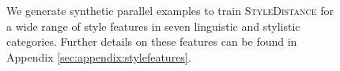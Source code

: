 {\begin{figure}[ht!]
{
        }
        \caption{We generate synthetic parallel examples to train \textsc{StyleDistance} for a wide range of style features in seven linguistic and stylistic categories. Further details on these features can be found in Appendix \ref{sec:appendix:stylefeatures}.}
        \label{fig:stylefeaturecategories}
    \end{figure}
}
